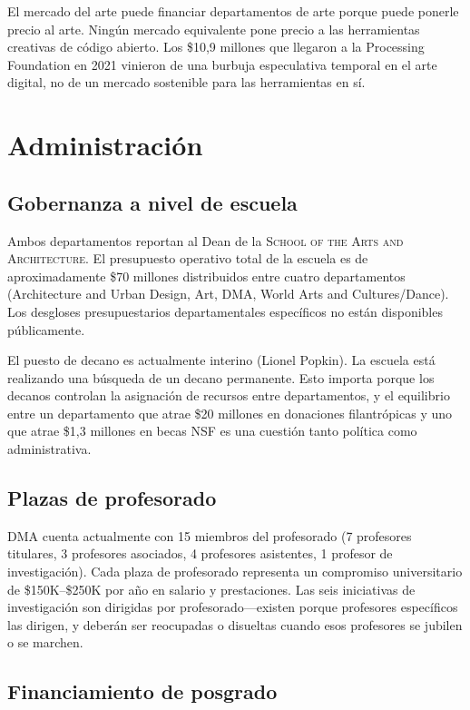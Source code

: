 \documentclass[10pt,letterpaper,twocolumn]{article}
\newcommand{\dma}{\textsc{DMA}}
\newcommand{\sofa}{\textsc{School of the Arts and Architecture}}
\begin{document}
El mercado del arte puede financiar departamentos de arte porque puede ponerle precio al arte. Ningún mercado equivalente pone precio a las herramientas creativas de código abierto. Los \$10,9 millones que llegaron a la Processing Foundation en 2021 vinieron de una burbuja especulativa temporal en el arte digital, no de un mercado sostenible para las herramientas en sí.

\section{Administración}

\subsection{Gobernanza a nivel de escuela}

Ambos departamentos reportan al Dean de la \sofa{}. El presupuesto operativo total de la escuela es de aproximadamente \$70 millones distribuidos entre cuatro departamentos (Architecture and Urban Design, Art, \dma{}, World Arts and Cultures/Dance). Los desgloses presupuestarios departamentales específicos no están disponibles públicamente.

El puesto de decano es actualmente interino (Lionel Popkin). La escuela está realizando una búsqueda de un decano permanente. Esto importa porque los decanos controlan la asignación de recursos entre departamentos, y el equilibrio entre un departamento que atrae \$20 millones en donaciones filantrópicas y uno que atrae \$1,3 millones en becas NSF es una cuestión tanto política como administrativa.

\subsection{Plazas de profesorado}

\dma{} cuenta actualmente con 15 miembros del profesorado (7 profesores titulares, 3 profesores asociados, 4 profesores asistentes, 1 profesor de investigación). Cada plaza de profesorado representa un compromiso universitario de \$150K--\$250K por año en salario y prestaciones. Las seis iniciativas de investigación son dirigidas por profesorado---existen porque profesores específicos las dirigen, y deberán ser reocupadas o disueltas cuando esos profesores se jubilen o se marchen.

\subsection{Financiamiento de posgrado}
\end{document}
